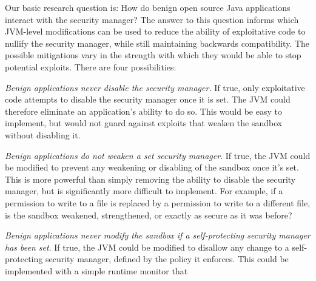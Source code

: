\documentclass{sig-alternate}
\begin{document}
Our basic research question is: How do benign open source Java applications interact
with the security manager? The answer to this question informs which JVM-level
modifications can be used to reduce the ability of exploitative code to
nullify the security manager, while still maintaining backwards compatibility.  The
possible mitigations vary in the strength with which they would be able to stop
potential exploits. 
There are four possibilities:
\begin{flushenum}	\setlength{\parskip}{0pt}
  \setlength{\parsep}{0pt}
  \setlength{\itemsep}{0pt}
\item \textit{Benign applications never disable the security manager.}  If true,
  only exploitative code attempts to disable the security manager once it is set.
  The JVM could therefore eliminate an application's ability to
  do so.  This would be easy to implement, but would not guard against exploits
  that weaken the sandbox without disabling it.
\item \textit{Benign applications do not weaken a set security manager}.  If
  true, the JVM could be modified to prevent any weakening or disabling of the 
  sandbox once it's set.  This is more powerful than simply removing the
  ability to disable the security manager, but is significantly more difficult to
  implement.
  For example, if a permission to write to a file is
  replaced by a permission to write to a different file, is the sandbox
  weakened, strengthened, or exactly as secure as it was before?
\item \textit{Benign applications never modify the sandbox if a self-protecting
    security manager has been set}. If true, the JVM could be modified to
  disallow any change to a self-protecting security manager, defined by the
  policy it enforces.  This could be implemented with a simple runtime monitor that

\end{flushenum}
\end{document}
